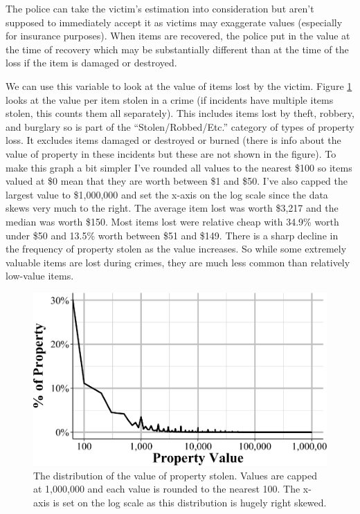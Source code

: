 \documentclass[
  12pt,
  openany]{book}
\begin{document}
The police can take the victim's estimation into consideration but aren't supposed to immediately accept it as victims may exaggerate values (especially for insurance purposes). When items are recovered, the police put in the value at the time of recovery which may be substantially different than at the time of the loss if the item is damaged or destroyed.

We can use this variable to look at the value of items lost by the victim. Figure \ref{fig:propertyValuePropertyLevel} looks at the value per item stolen in a crime (if incidents have multiple items stolen, this counts them all separately). This includes items lost by theft, robbery, and burglary so is part of the ``Stolen/Robbed/Etc.'' category of types of property loss. It excludes items damaged or destroyed or burned (there is info about the value of property in these incidents but these are not shown in the figure). To make this graph a bit simpler I've rounded all values to the nearest \$100 so items valued at \$0 mean that they are worth between \$1 and \$50. I've also capped the largest value to \$1,000,000 and set the x-axis on the log scale since the data skews very much to the right. The average item lost was worth \$3,217 and the median was worth \$150. Most items lost were relative cheap with 34.9\% worth under \$50 and 13.5\% worth between \$51 and \$149. There is a sharp decline in the frequency of property stolen as the value increases. So while some extremely valuable items are lost during crimes, they are much less common than relatively low-value items.

\begin{figure}

{\centering \includegraphics[width=0.9\linewidth]{17_nibrs_property_files/figure-latex/propertyValuePropertyLevel-1} 

}

\caption{The distribution of the value of property stolen. Values are capped at 1,000,000 and each value is rounded to the nearest 100. The x-axis is set on the log scale as this distribution is hugely right skewed.}\label{fig:propertyValuePropertyLevel}
\end{figure}
\end{document}
